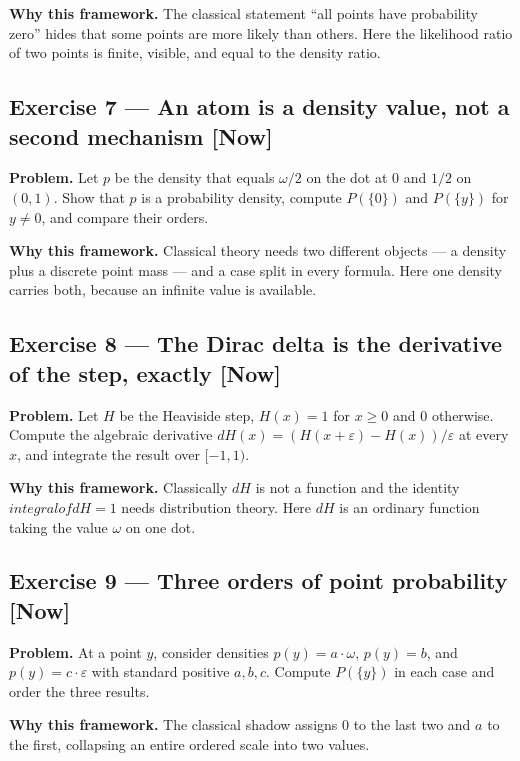 \documentclass[11pt]{article}
\newcommand{\eps}{\varepsilon}
\begin{document}
\textbf{Why this framework.} The classical statement ``all points have probability
zero'' hides that some points are more likely than others. Here the likelihood
ratio of two points is finite, visible, and equal to the density ratio.


\subsection*{Exercise 7 --- An atom is a density value, not a second mechanism \hfill \normalfont\small[Now]}

\textbf{Problem.} Let $p$ be the density that equals $\omega/2$ on the dot at $0$
and $1/2$ on $(0,1)$. Show that $p$ is a probability density, compute
$P(\{0\})$ and $P(\{y\})$ for $y \neq  0$, and compare their orders.

\textbf{Why this framework.} Classical theory needs two different objects --- a
density plus a discrete point mass --- and a case split in every formula. Here
one density carries both, because an infinite value is available.


\subsection*{Exercise 8 --- The Dirac delta is the derivative of the step, exactly \hfill \normalfont\small[Now]}

\textbf{Problem.} Let $H$ be the Heaviside step, $H(x) = 1$ for $x \ge  0$ and $0$
otherwise. Compute the algebraic derivative $dH(x) = (H(x+\eps)-H(x))/\eps$
at every $x$, and integrate the result over $[-1,1)$.

\textbf{Why this framework.} Classically $dH$ is not a function and the identity
$integral of dH = 1$ needs distribution theory. Here $dH$ is an ordinary
function taking the value $\omega$ on one dot.


\subsection*{Exercise 9 --- Three orders of point probability \hfill \normalfont\small[Now]}

\textbf{Problem.} At a point $y$, consider densities $p(y) = a\cdot \omega$, $p(y) = b$,
and $p(y) = c\cdot \eps$ with standard positive $a,b,c$. Compute $P(\{y\})$ in
each case and order the three results.

\textbf{Why this framework.} The classical shadow assigns $0$ to the last two and
$a$ to the first, collapsing an entire ordered scale into two values.
\end{document}
